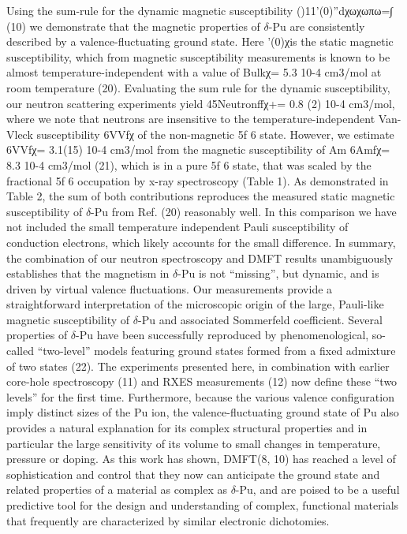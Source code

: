 \documentclass[10pt]{ruthesis}
\begin{document}
{Using the sum-rule for the dynamic magnetic susceptibility ()11'(0)''dχωχωπω=∫ (10) we demonstrate that the magnetic properties of $\delta$-Pu are consistently described by a valence-fluctuating ground state. Here '(0)χis the static magnetic susceptibility, which from magnetic susceptibility measurements is known to be almost temperature-independent with a value of Bulkχ= 5.3 10-4 cm3/mol at room temperature (20). Evaluating the sum rule for the dynamic susceptibility, our neutron scattering experiments yield 45Neutronffχ+= 0.8 (2) 10-4 cm3/mol, where we note that neutrons are insensitive to the temperature-independent Van-Vleck susceptibility 6VVfχ of the non-magnetic 5f 6 state. However, we estimate 6VVfχ= 3.1(15) 10-4 cm3/mol from the magnetic susceptibility of Am 6Amfχ= 8.3 10-4 cm3/mol (21), which is in a pure 5f 6 state, that was scaled by the fractional 5f 6 occupation by x-ray spectroscopy (Table 1). As demonstrated in Table 2, the sum of both contributions reproduces the measured static magnetic susceptibility of
$\delta$-Pu from Ref. (20) reasonably well. In this comparison we have not included the small temperature independent Pauli susceptibility of conduction electrons, which likely accounts for the small difference.
In summary, the combination of our neutron spectroscopy and DMFT results unambiguously establishes that the magnetism in $\delta$-Pu is not “missing”, but dynamic, and is driven by virtual valence fluctuations. Our measurements provide a straightforward interpretation of the microscopic origin of the large, Pauli-like magnetic susceptibility of $\delta$-Pu and associated Sommerfeld coefficient. Several properties of $\delta$-Pu have been successfully reproduced by phenomenological, so-called “two-level” models featuring ground states formed from a fixed admixture of two states (22). The experiments presented here, in combination with earlier core-hole spectroscopy (11) and RXES measurements (12) now define these “two levels” for the first time. Furthermore, because the various valence configuration imply distinct sizes of the Pu ion, the valence-fluctuating ground state of Pu also provides a natural explanation for its complex structural properties and in particular the large sensitivity of its volume to small changes in temperature, pressure or doping. As this work has shown, DMFT(8, 10) has reached a level of sophistication and control that they now can anticipate the ground state and related properties of a material as complex as $\delta$-Pu, and are poised to be a useful predictive tool for the design and understanding of complex, functional materials that frequently are characterized by similar electronic dichotomies.
  






}
\end{document}
